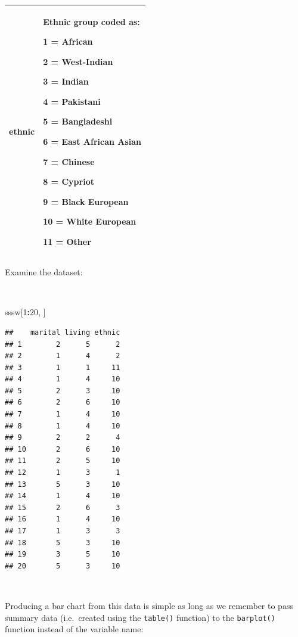 \documentclass[12pt,a4paper]{book}
\newenvironment{Shaded}{\begin{snugshade}}{\end{snugshade}}
\newcommand{\DecValTok}[1]{\textcolor[rgb]{0.00,0.00,0.81}{#1}}
\newcommand{\OperatorTok}[1]{\textcolor[rgb]{0.81,0.36,0.00}{\textbf{#1}}}
\newcommand{\NormalTok}[1]{#1}
\theoremstyle{definition}
\theoremstyle{definition}
\theoremstyle{definition}
\theoremstyle{remark}
\begin{document}
\begin{longtable}[]{@{}ll@{}}
\toprule
\begin{minipage}[t]{0.48\columnwidth}\raggedright
\textbf{ethnic}\strut
\end{minipage} & \begin{minipage}[t]{0.48\columnwidth}\raggedright
Ethnic group coded as:

1 = African

2 = West-Indian

3 = Indian

4 = Pakistani

5 = Bangladeshi

6 = East African Asian

7 = Chinese

8 = Cypriot

9 = Black European

10 = White European

11 = Other\strut
\end{minipage}\tabularnewline
\bottomrule
\end{longtable}

\newpage

Examine the dataset:

~

\begin{Shaded}
\begin{Highlighting}[]
\NormalTok{sssw[}\DecValTok{1}\OperatorTok{:}\DecValTok{20}\NormalTok{, ]}
\end{Highlighting}
\end{Shaded}

\begin{verbatim}
##    marital living ethnic
## 1        2      5      2
## 2        1      4      2
## 3        1      1     11
## 4        1      4     10
## 5        2      3     10
## 6        2      6     10
## 7        1      4     10
## 8        1      4     10
## 9        2      2      4
## 10       2      6     10
## 11       2      5     10
## 12       1      3      1
## 13       5      3     10
## 14       1      4     10
## 15       2      6      3
## 16       1      4     10
## 17       1      3      3
## 18       5      3     10
## 19       3      5     10
## 20       5      3     10
\end{verbatim}

~

Producing a bar chart from this data is simple as long as we remember to
pass summary data (i.e.~created using the \texttt{table()} function) to
the \texttt{barplot()} function instead of the variable name:
\end{document}

